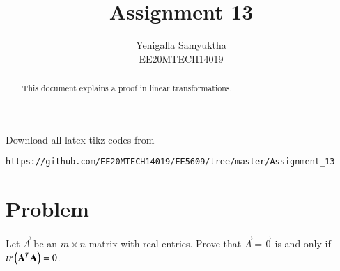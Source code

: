 \documentclass[journal,12pt,twocolumn]{IEEEtran}
\numberwithin{table}{section}
\begin{document}
     \def\rightbox#1{\makebox[0in][r]{#1}}
     \def\centbox#1{\makebox[0in]{#1}}
     \def\topbox#1{\raisebox{-\baselineskip}[0in][0in]{#1}}
     \def\midbox#1{\raisebox{-0.5\baselineskip}[0in][0in]{#1}}
\vspace{3cm}
\title{Assignment 13}
\author{Yenigalla Samyuktha\\EE20MTECH14019}
\maketitle
\newpage
\bigskip
\renewcommand{\thefigure}{\theenumi}
\renewcommand{\thetable}{1}
\setlength{\tabcolsep}{20pt}
\renewcommand{\arraystretch}{1.5}
\begin{abstract}
This document explains a proof in linear transformations.
\end{abstract}
Download all latex-tikz codes from 
%
\begin{lstlisting}
https://github.com/EE20MTECH14019/EE5609/tree/master/Assignment_13
\end{lstlisting}
%
\section{Problem}
Let $\vec{A}$ be an $m\times n$ matrix with real entries. Prove that $\vec{A}=\vec{0}$ is and only if $tr\left(\mathbf{A}^T\mathbf{A}\right)=0$.
\end{document}
